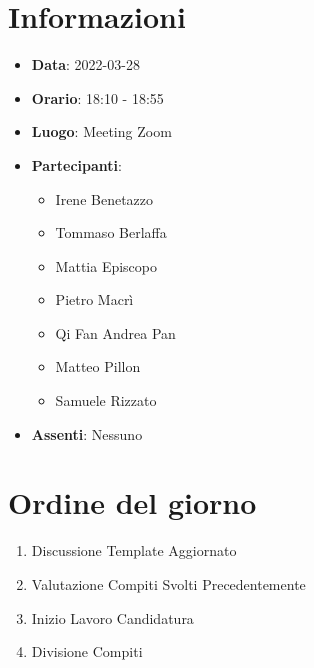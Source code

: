 \section{Informazioni}
	\begin{itemize}
		\item \textbf{Data}: 2022-03-28     %
		\item \textbf{Orario}: 18:10 - 18:55      %
		\item \textbf{Luogo}: Meeting Zoom
		\item \textbf{Partecipanti}:
		\begin{itemize}
			\item Irene Benetazzo
			\item Tommaso Berlaffa
			\item Mattia Episcopo
			\item Pietro Macrì
			\item Qi Fan Andrea Pan
			\item Matteo Pillon
			\item Samuele Rizzato
		\end{itemize}
        \item \textbf{Assenti}: Nessuno
	\end{itemize}
    
	\section{Ordine del giorno}
	\begin{enumerate}
		\item Discussione Template Aggiornato
		\item Valutazione Compiti Svolti Precedentemente
		\item Inizio Lavoro Candidatura
		\item Divisione Compiti
	\end{enumerate}
	\newpage